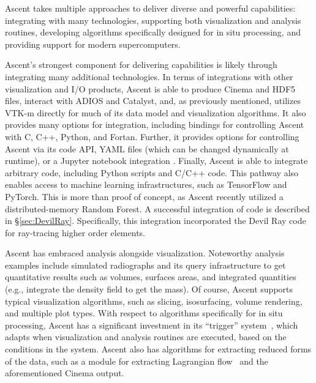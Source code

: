 \documentclass[graybox]{svmult}
\begin{document}
Ascent takes multiple approaches to deliver diverse and powerful capabilities:
integrating with many technologies,
supporting both visualization and analysis routines,
developing algorithms specifically designed for in situ processing,
and providing support for modern supercomputers.

Ascent's strongest component for delivering capabilities is likely
through integrating many additional technologies.
%
In terms of integrations with other visualization and I/O products,
Ascent is able to produce Cinema and HDF5 files, interact with
ADIOS and Catalyst, and, as previously mentioned, utilizes VTK-m
directly for much of its data model and visualization algorithms.
%
It also provides many options for integration, including
bindings
for controlling Ascent with  C, C++, Python, and Fortan.
%
Further, it provides options for controlling Ascent via its code API,
YAML files (which can be changed dynamically at runtime), or
a Jupyter notebook integration \cite{CyrusISAV}.
%
Finally, Ascent is able to integrate arbitrary code, including
Python scripts and C/C++ code.
%
This pathway also enables access to
machine learning infrastructures, such as TensorFlow and PyTorch.
%
This is more than proof of concept,
as Ascent recently utilized a distributed-memory Random Forest.
%
A successful integration of code is described in \S\ref{sec:DevilRay}.
%
Specifically, this integration incorporated the Devil Ray code for ray-tracing
higher order elements.

Ascent has embraced analysis alongside visualization.
%
Noteworthy analysis examples include simulated radiographs and its
query infrastructure to get quantitative results such as volumes,
surfaces areas, and integrated quantities (e.g., integrate the density field to get the mass).
%
Of course, Ascent supports typical visualization algorithms, such as
slicing, isosurfacing, volume rendering, and multiple plot types.
%
With respect to algorithms specifically for in situ processing, Ascent
has a significant investment in its ``trigger'' system~\cite{Larsen:ISAV18},
which adapts when visualization and analysis routines are executed,
based on the conditions in the system.
%
Ascent also has algorithms for extracting reduced forms of the data,
such as a module for extracting Lagrangian flow~\cite{Agranovsky:LDAV2014,Sane:EGPGV19} and the
aforementioned Cinema output.
\end{document}
